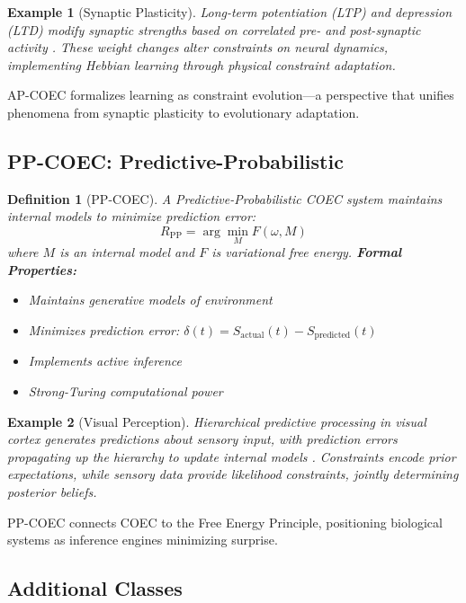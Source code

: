 \documentclass[11pt]{article}
\newtheorem{definition}{Definition}
\newtheorem{example}{Example}
\begin{document}
\begin{example}[Synaptic Plasticity]
Long-term potentiation (LTP) and depression (LTD) modify synaptic strengths based on correlated pre- and post-synaptic activity \citep{bliss1993synaptic}. These weight changes alter constraints on neural dynamics, implementing Hebbian learning through physical constraint adaptation.
\end{example}

AP-COEC formalizes learning as constraint evolution—a perspective that unifies phenomena from synaptic plasticity to evolutionary adaptation.

\subsection{PP-COEC: Predictive-Probabilistic}

\begin{definition}[PP-COEC]
A Predictive-Probabilistic COEC system maintains internal models to minimize prediction error:
\begin{equation}
R_{\text{PP}} = \arg\min_M F(\omega, M)
\end{equation}
where $M$ is an internal model and $F$ is variational free energy.
\textbf{Formal Properties:}
\begin{itemize}
\item Maintains generative models of environment
\item Minimizes prediction error: $\delta(t) = S_{\text{actual}}(t) - S_{\text{predicted}}(t)$
\item Implements active inference \citep{friston2010free}
\item Strong-Turing computational power
\end{itemize}
\end{definition}

\begin{example}[Visual Perception]
Hierarchical predictive processing in visual cortex generates predictions about sensory input, with prediction errors propagating up the hierarchy to update internal models \citep{rao1999predictive}. Constraints encode prior expectations, while sensory data provide likelihood constraints, jointly determining posterior beliefs.
\end{example}

PP-COEC connects COEC to the Free Energy Principle, positioning biological systems as inference engines minimizing surprise.

\subsection{Additional Classes}
\end{document}
